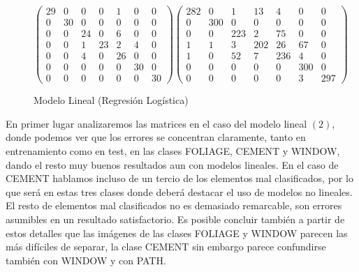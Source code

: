 \documentclass{article}
\begin{document}
	\begin{figure}[H]
	\begin{equation}
		\begin{pmatrix}
			29 & 0 & 0 & 0 & 1 & 0 & 0\\
			0 & 30 & 0 & 0 & 0 & 0 & 0\\
			0 & 0 & 24 & 0 & 6 & 0 & 0\\
			0 & 0 & 1 & 23 & 2 & 4 & 0\\
			0 & 0 & 4 & 0 & 26 & 0 & 0\\
			0 & 0 & 0 & 0 & 0 & 30 & 0\\
			0 & 0 & 0 & 0 & 0 & 0 & 30
		\end{pmatrix}
		\begin{pmatrix}
		282 & 0 & 1 & 13 & 4 & 0 & 0\\
		0 & 300 & 0 & 0 & 0 & 0 & 0\\
		0 & 0 & 223 & 2 & 75 & 0 & 0\\
		1 & 1 & 3 & 202 & 26 & 67 & 0\\
		1 & 0 & 52 & 7 & 236 & 4 & 0\\
		0 & 0 & 0 & 0 & 0 & 300 & 0\\
		0 & 0 & 0 & 0 & 0 & 3 & 297
		\end{pmatrix}
	\end{equation}
	\caption{Modelo Lineal (Regresión Logística)}
	\end{figure}
		En primer lugar analizaremos las matrices en el caso del modelo lineal $(2)$, donde podemos ver que los errores se concentran claramente, tanto en entrenamiento como en test, en las clases FOLIAGE, CEMENT y WINDOW, dando el resto muy buenos resultados aun con modelos lineales. En el caso de CEMENT hablamos incluso de un tercio de los elementos mal clasificados, por lo que será en estas tres clases donde deberá destacar el uso de modelos no lineales. El resto de elementos mal clasificados no es demasiado remarcable, son errores asumibles en un resultado satisfactorio. Es posible concluir también a partir de estos detalles que las imágenes de las clases FOLIAGE y WINDOW parecen las más difíciles de separar, la clase CEMENT sin embargo parece confundirse también con WINDOW y con PATH.
\end{document}
